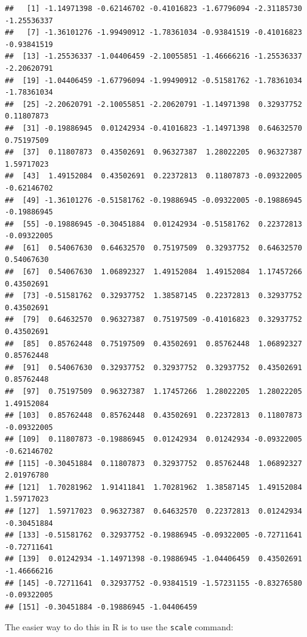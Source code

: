 \documentclass[
]{book}
\newenvironment{Shaded}{\begin{snugshade}}{\end{snugshade}}
\newcommand{\FunctionTok}[1]{\textcolor[rgb]{0.00,0.00,0.00}{#1}}
\newcommand{\NormalTok}[1]{#1}
\newcommand{\SpecialCharTok}[1]{\textcolor[rgb]{0.00,0.00,0.00}{#1}}
\begin{document}
\begin{verbatim}
##   [1] -1.14971398 -0.62146702 -0.41016823 -1.67796094 -2.31185730 -1.25536337
##   [7] -1.36101276 -1.99490912 -1.78361034 -0.93841519 -0.41016823 -0.93841519
##  [13] -1.25536337 -1.04406459 -2.10055851 -1.46666216 -1.25536337 -2.20620791
##  [19] -1.04406459 -1.67796094 -1.99490912 -0.51581762 -1.78361034 -1.78361034
##  [25] -2.20620791 -2.10055851 -2.20620791 -1.14971398  0.32937752  0.11807873
##  [31] -0.19886945  0.01242934 -0.41016823 -1.14971398  0.64632570  0.75197509
##  [37]  0.11807873  0.43502691  0.96327387  1.28022205  0.96327387  1.59717023
##  [43]  1.49152084  0.43502691  0.22372813  0.11807873 -0.09322005 -0.62146702
##  [49] -1.36101276 -0.51581762 -0.19886945 -0.09322005 -0.19886945 -0.19886945
##  [55] -0.19886945 -0.30451884  0.01242934 -0.51581762  0.22372813 -0.09322005
##  [61]  0.54067630  0.64632570  0.75197509  0.32937752  0.64632570  0.54067630
##  [67]  0.54067630  1.06892327  1.49152084  1.49152084  1.17457266  0.43502691
##  [73] -0.51581762  0.32937752  1.38587145  0.22372813  0.32937752  0.43502691
##  [79]  0.64632570  0.96327387  0.75197509 -0.41016823  0.32937752  0.43502691
##  [85]  0.85762448  0.75197509  0.43502691  0.85762448  1.06892327  0.85762448
##  [91]  0.54067630  0.32937752  0.32937752  0.32937752  0.43502691  0.85762448
##  [97]  0.75197509  0.96327387  1.17457266  1.28022205  1.28022205  1.49152084
## [103]  0.85762448  0.85762448  0.43502691  0.22372813  0.11807873 -0.09322005
## [109]  0.11807873 -0.19886945  0.01242934  0.01242934 -0.09322005 -0.62146702
## [115] -0.30451884  0.11807873  0.32937752  0.85762448  1.06892327  2.01976780
## [121]  1.70281962  1.91411841  1.70281962  1.38587145  1.49152084  1.59717023
## [127]  1.59717023  0.96327387  0.64632570  0.22372813  0.01242934 -0.30451884
## [133] -0.51581762  0.32937752 -0.19886945 -0.09322005 -0.72711641 -0.72711641
## [139]  0.01242934 -1.14971398 -0.19886945 -1.04406459  0.43502691 -1.46666216
## [145] -0.72711641  0.32937752 -0.93841519 -1.57231155 -0.83276580 -0.09322005
## [151] -0.30451884 -0.19886945 -1.04406459
\end{verbatim}

The easier way to do this in R is to use the \texttt{scale} command:

\begin{Shaded}
\end{Shaded}
\end{document}
